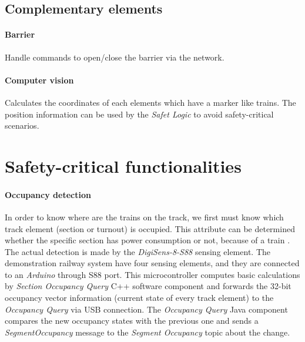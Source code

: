 \subsection{Complementary elements}
\paragraph{Barrier} 
Handle commands to open/close the barrier via the network.
\paragraph{Computer vision}
Calculates the coordinates of each elements which have a marker like trains. The position information can be used by the \textit{Safet Logic} to avoid safety-critical scenarios.

\section{Safety-critical functionalities}\label{section:SC-Functionalities}


\paragraph{Occupancy detection}\label{par:FunctionOccupancyDetection}
In order to know where are the trains on the track, we first must know which track element (section or turnout) is occupied. This attribute can be determined whether the specific section has power consumption or not, because of a train . The actual detection is made by the \textit{DigiSens-8-S88} sensing element. The demonstration railway system have four sensing elements, and they are connected to an \textit{Arduino} through S88 port. This microcontroller computes basic calculations by \textit{Section Occupancy Query} C++ software component and forwards the 32-bit occupancy vector information (current state of every track element) to the \textit{Occupancy Query} via USB connection. The \textit{Occupancy Query} Java component compares the new occupancy states with the previous one and sends a \textit{SegmentOccupancy} message to the \textit{Segment Occupancy} topic about the change.

